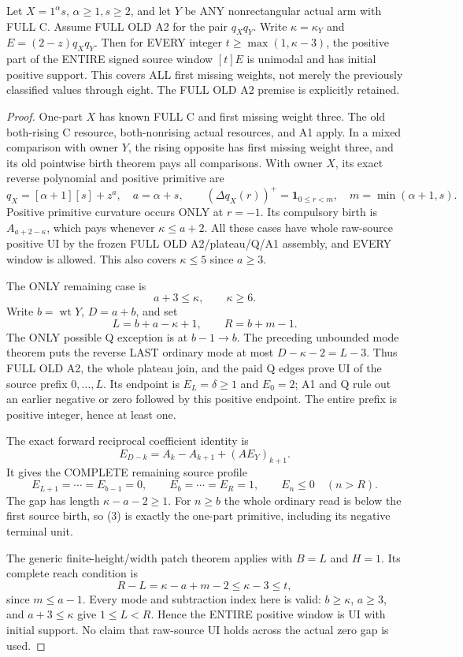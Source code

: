 \begin{theorem}
Let $X=1^\alpha s$, $\alpha\ge1,s\ge2$, and let $Y$ be ANY
nonrectangular actual arm with FULL C. Assume FULL OLD A2 for
the pair $q_Xq_Y$. Write $\kappa=\kappa_Y$ and $E=(2-z)q_Xq_Y$.
Then for EVERY integer $t\ge\max(1,\kappa-3)$, the positive part
of the ENTIRE signed source window $[t]E$ is unimodal and has
initial positive support. This covers ALL first missing weights,
not merely the previously classified values through eight.
The FULL OLD A2 premise is explicitly retained.
\end{theorem}
\begin{proof}
One-part $X$ has known FULL C and first missing weight three.
The old both-rising C resource, both-nonrising actual resources,
and A1 apply. In a mixed comparison with owner $Y$, the rising
opposite has first missing weight three, and its old pointwise
birth theorem pays all comparisons. With owner $X$, its exact
reverse polynomial and positive primitive are
\[
 q_X=[\alpha+1][s]+z^a,\quad a=\alpha+s,\qquad
 (\Delta q_X(r))^+=\mathbf1_{0\le r<m},\quad
 m=\min(\alpha+1,s).
\]
Positive primitive curvature occurs ONLY at $r=-1$. Its compulsory
birth is $A_{a+2-\kappa}$, which pays whenever $\kappa\le a+2$.
All these cases have whole raw-source positive UI by the frozen
FULL OLD A2/plateau/Q/A1 assembly, and EVERY window is allowed.
This also covers $\kappa\le5$ since $a\ge3$.

The ONLY remaining case is
\[
 a+3\le\kappa,\qquad\kappa\ge6.
\]
Write $b=\operatorname{wt}Y$, $D=a+b$, and set
\[
 L=b+a-\kappa+1,\qquad R=b+m-1.
\]
The ONLY possible Q exception is at $b-1\to b$. The preceding
unbounded mode theorem puts the reverse LAST ordinary mode at
most $D-\kappa-2=L-3$. Thus FULL OLD A2, the whole plateau join,
and the paid Q edges prove UI of the source prefix $0,\ldots,L$.
Its endpoint is $E_L=\delta\ge1$ and $E_0=2$; A1 and Q rule out
an earlier negative or zero followed by this positive endpoint.
The entire prefix is positive integer, hence at least one.

The exact forward reciprocal coefficient identity is
\[
 E_{D-k}=A_k-A_{k+1}+(A E_Y)_{k+1}.
\]
It gives the COMPLETE remaining source profile
\[
 E_{L+1}=\cdots=E_{b-1}=0,\qquad
 E_b=\cdots=E_R=1,\qquad E_n\le0\quad(n>R).           \tag{3}
\]
The gap has length $\kappa-a-2\ge1$. For $n\ge b$ the whole
ordinary read is below the first source birth, so (3) is exactly
the one-part primitive, including its negative terminal unit.

The generic finite-height/width patch theorem applies with
$B=L$ and $H=1$. Its complete reach condition is
\[
 R-L=\kappa-a+m-2\le\kappa-3\le t,
\]
since $m\le a-1$. Every mode and subtraction index here is valid:
$b\ge\kappa$, $a\ge3$, and $a+3\le\kappa$ give $1\le L<R$.
Hence the ENTIRE positive window is UI with initial support.
No claim that raw-source UI holds across the actual zero gap is used.
\end{proof}

